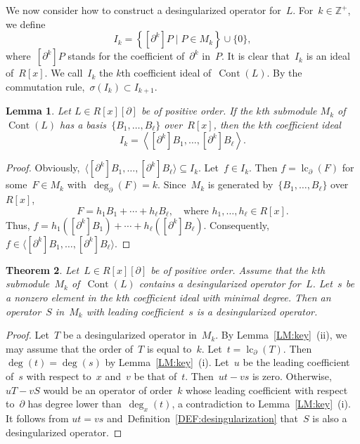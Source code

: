 \documentclass{sig-alternate}
\newcommand{\bZ} { {\mathbb{Z}}}
\newcommand{\cont}{\operatorname{Cont}}
\newcommand{\lc}{\operatorname{lc}}
\newcommand{\pa}{\partial}
\newtheorem{theorem}{Theorem}[section]
\newtheorem{lemma}[theorem]{Lemma}
\begin{document}
We now consider how to construct a desingularized operator for~$L$. For~$k \in \bZ^+$, we define
\[  I_k = \left\{ [\pa^k] P \mid P \in M_k \right\} \cup \{0\}, \]
where~$[\pa^k] P$ stands for the coefficient of~$\pa^k$ in~$P$. It is clear that~$I_k$ is an ideal of~$R[x]$.
We call~$I_k$ the $k$th coefficient ideal of~$\cont(L)$. By the commutation rule,~$\sigma(I_k) \subset I_{k+1}$.
\begin{lemma}\label{LM:dop}
Let $L \in R[x][\pa]$ be of positive order.
If the $k$th submodule $M_k$ of~$\cont(L)$ has a basis~$\{B_1, \ldots, B_\ell \}$ over~$R[x]$,
then the $k$th coefficient ideal
$$I_k = \left\langle [ \pa^k ] B_1, \ldots,  [ \pa^k ] B_\ell  \right\rangle.$$
\end{lemma}
\begin{proof}
 Obviously,~$\langle [ \pa^k ] B_1, \ldots,  [ \pa^k ] B_\ell \rangle \subseteq I_k$.
 Let~$f \in I_k$. Then $f = \lc_{\pa}(F)$ for some~$F \in M_k$ with~$\deg_{\pa}(F) = k$.
 Since~$M_k$ is generated by~$\{B_1, \ldots, B_\ell \}$ over~$R[x]$,
\[
 F = h_1 B_1 + \cdots + h_\ell B_\ell, \quad
\text{where~$h_1, \ldots, h_\ell \in R[x]$.}\] Thus,
$f  = h_1 \left( [ \pa^k ] B_1 \right) + \cdots + h_\ell \left( [ \pa^k ] B_\ell \right).$
Consequently, $f \in \langle [ \pa^k ] B_1, \ldots,  [ \pa^k ] B_\ell \rangle$.
\end{proof}
\begin{theorem} \label{TH:dop}
Let~$L \in R[x][\pa]$ be of positive order. Assume that the $k$th submodule~$M_k$ of~$\cont(L)$
contains a desingularized operator for~$L$. Let~$s$ be a nonzero element in the $k$th coefficient ideal
with minimal degree. Then an operator~$S$ in~$M_k$ with leading coefficient~$s$ is a desingularized operator.
\end{theorem}
\begin{proof}
Let~$T$ be a desingularized operator in~$M_k$. By Lemma~\ref{LM:key}~(ii), we may assume that the order of~$T$ is equal to~$k$.
Let~$t = \lc_\pa(T)$. Then~$\deg(t)=\deg(s)$ by Lemma~\ref{LM:key}~(i).
Let~$u$ be the leading coefficient of~$s$ with respect to~$x$ and~$v$ be that of~$t$.
Then~$ut-vs$ is zero. Otherwise, $u T - v S$ would be an operator of order~$k$ whose leading coefficient with respect to~$\pa$
has degree lower than~$\deg_x(t)$, a contradiction to Lemma~\ref{LM:key}~(i).
It follows from $ut=vs$ and~Definition~\ref{DEF:desingularization} that~$S$ is also a desingularized operator.
\end{proof}
\end{document}
